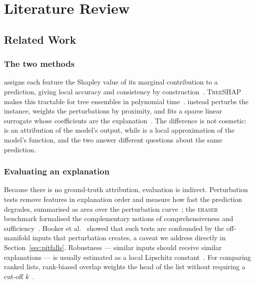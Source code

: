 \chapter{Literature Review}\label{ch:literature}

\section{Related Work}\label{sec:related}

\subsection{The two methods}
\shap{} assigns each feature the Shapley value of its marginal contribution to a
prediction, giving local accuracy and consistency by
construction~\cite{lundberg2017unified}. \textsc{TreeSHAP} makes this tractable for
tree ensembles in polynomial time~\cite{lundberg2020local}. \lime{} instead perturbs
the instance, weights the perturbations by proximity, and fits a sparse linear
surrogate whose coefficients are the explanation~\cite{ribeiro2016why}. The
difference is not cosmetic: \shap{} is an attribution of the model's output, while
\lime{} is a local approximation of the model's function, and the two answer
different questions about the same prediction.

\subsection{Evaluating an explanation}
Because there is no ground-truth attribution, evaluation is indirect. Perturbation
tests remove features in explanation order and measure how fast the prediction
degrades, summarised as area over the perturbation curve~\cite{samek2017evaluating};
the \textsc{eraser} benchmark formalised the complementary notions of
comprehensiveness and sufficiency~\cite{deyoung2020eraser}. Hooker et
al.~\cite{hooker2019benchmark} showed that such tests are confounded by the
off-manifold inputs that perturbation creates, a caveat we address directly in
Section~\ref{sec:pitfalls}. Robustness --- similar inputs should receive similar
explanations --- is usually estimated as a local Lipschitz
constant~\cite{alvarezmelis2018robustness}. For comparing ranked lists, rank-biased
overlap weights the head of the list without requiring a cut-off
$k$~\cite{webber2010similarity}.

